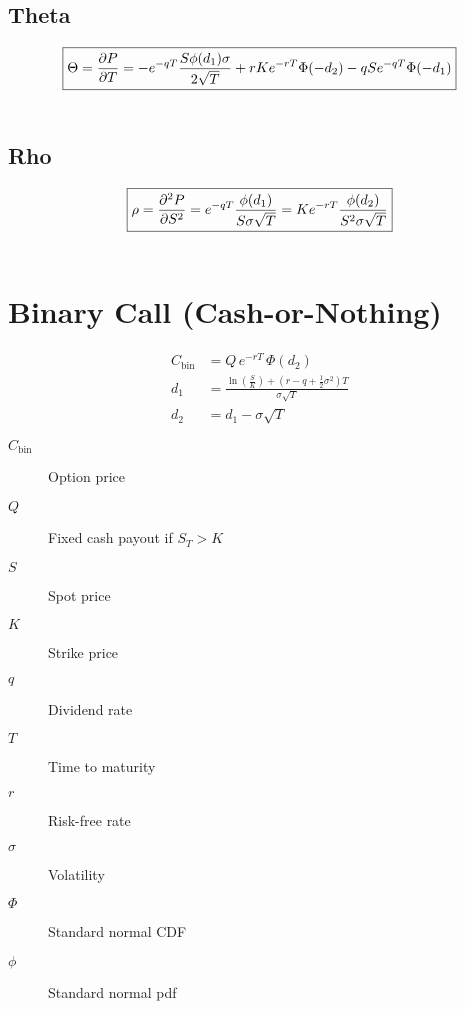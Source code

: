 \documentclass[12pt,a4paper]{article}
\begin{document}
\subsection{Theta}

\[
  \boxed{\Theta = \frac{\partial P}{\partial T} = -e^{-qT}\frac{S\phi(d_1)\sigma}{2\sqrt{T}} + rKe^{-rT}\Phi(-d_2) - qSe^{-qT}\Phi(-d_1)}\\
\]


\[
  \begin{aligned}
  \end{aligned}
\]

\subsection{Rho}

\[
  \boxed{\rho = \frac{\partial^2 P}{\partial S^2} = e^{-qT}\frac{\phi(d_1)}{S\sigma\sqrt{T}} = Ke^{-rT} \frac{\phi(d_2)}{S^2\sigma\sqrt{T}}}\\
\]

\[
  \begin{aligned}
  \end{aligned}
\]

\newpage

\section{Binary Call (Cash-or-Nothing)}

\[
  \begin{aligned}
    C_{\mathrm{bin}} & = Q \, e^{-rT} \,\Phi(d_2) \\
    d_1 & = \frac{\ln\!\left(\tfrac{S}{K}\right) + (r - q + \tfrac{1}{2}\sigma^2)T}{\sigma \sqrt{T}} \\
    d_2 & = d_1 - \sigma \sqrt{T}
  \end{aligned}
\]

\begin{description}
  \item[$C_{\mathrm{bin}}$] Option price
  \item[$Q$] Fixed cash payout if \( S_T > K \)
  \item[$S$] Spot price
  \item[$K$] Strike price
  \item[$q$] Dividend rate
  \item[$T$] Time to maturity
  \item[$r$] Risk-free rate
  \item[$\sigma$] Volatility
  \item[$\Phi$] Standard normal CDF
  \item[$\phi$] Standard normal pdf
\end{description}
\end{document}
